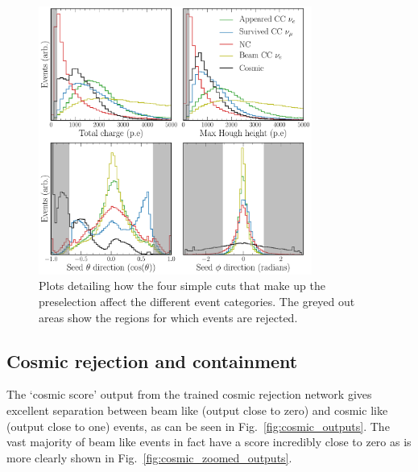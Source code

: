 \begin{figure} %
    \includegraphics[width=0.8\textwidth]{diagrams/6-cvn/chipsnet/explore_simple_cuts.pdf}
    \caption[Plot detailing preselection cuts.]
    {Plots detailing how the four simple cuts that make up the preselection affect the different
        event categories. The greyed out areas show the regions for which events are rejected.}
    \label{fig:explore_simple_cuts}
\end{figure}

\subsection{Cosmic rejection and containment} %
\label{sec:cvn_results_cosmic} %

The `cosmic score' output from the trained cosmic rejection network gives excellent separation
between beam like (output close to zero) and cosmic like (output close to one) events, as can be
seen in Fig.~\ref{fig:cosmic_outputs}. The vast majority of beam like events in fact have a score
incredibly close to zero as is more clearly shown in Fig.~\ref{fig:cosmic_zoomed_outputs}.

